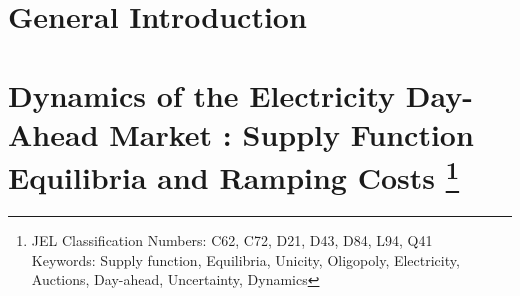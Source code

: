 \documentclass[book,12pt,twoside,openright,authoryear]{report}
\begin{document}







\renewcommand{\cftchappresnum}{Chapter\space}
\renewcommand{\cftchapaftersnum}{:}
\renewcommand{\cftchapnumwidth}{6em}

\onehalfspace
{}
\cleardoublepage


\renewcommand{\thesection}{\arabic{chapter}.\arabic{section}}
\chapter*{General Introduction}
\label{chap:intro}
\pagestyle{empty} 
\cleardoublepage
\pagestyle{fancy} 
\fancyhead{} 
\lhead[Introduction]{}
\fancyfoot{}
	\fancyfoot[LE]{\thepage}


\renewcommand{\thesection}{\arabic{chapter}.\arabic{section}}
\chapter[Dynamics of the Electricity Day-Ahead Market : Supply Function Equilibria and Ramping Costs]{Dynamics of the Electricity Day-Ahead Market : Supply Function Equilibria and Ramping Costs \footnote{JEL Classification Numbers:  C62, C72, D21, D43, D84, L94, Q41 \\
Keywords: Supply function, Equilibria, Unicity, Oligopoly, Electricity, Auctions, Day-ahead, Uncertainty, Dynamics}}
\label{chap:ch1}
\pagestyle{empty} 
\cleardoublepage
\pagestyle{fancy} 
\fancyhead{} 

\fancyfoot{}
\fancyfoot[LE]{\thepage}

\end{document}
